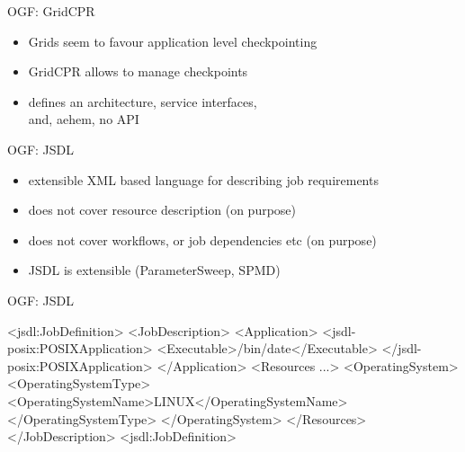 \documentclass[%
  pdf,
  colorBG,
  slideColor,
  frames,
  ogf
]{prosper}
\newcommand{\dn}{\vspace*{+1em}}
\begin{document}

 \begin{slide}{OGF: GridCPR}

 \dn 

  \begin{itemize}
   \item Grids seem to favour application level checkpointing
   \item GridCPR allows to manage checkpoints 
   \item defines an architecture, service interfaces,\\
         and, aehem, no API
  \end{itemize}

 \end{slide}


 \begin{slide}{OGF: JSDL}

 \dn 

  \begin{itemize}
   \item extensible XML based language for describing job requirements
   \item does not cover resource description (on purpose)
   \item does not cover workflows, or job dependencies etc (on purpose)
   \item JSDL is extensible (ParameterSweep, SPMD)
  \end{itemize}

 \end{slide}


 \begin{slide}{OGF: JSDL}

  \begin{mycode}[label=JSDL: Simple Job]
   <jsdl:JobDefinition>
     <JobDescription>
        <Application>
           <jsdl-posix:POSIXApplication>
              <Executable>/bin/date</Executable>
           </jsdl-posix:POSIXApplication>
        </Application>
        <Resources ...>
           <OperatingSystem>
              <OperatingSystemType>
                 <OperatingSystemName>LINUX</OperatingSystemName>
              </OperatingSystemType>
           </OperatingSystem>
        </Resources>
     </JobDescription>
  <jsdl:JobDefinition>
  \end{mycode}

 \end{slide}
\end{document}
